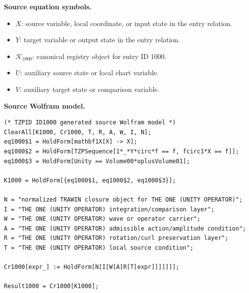 \begin{minipage}[t]{0.49\linewidth}
\begingroup
\small
\raggedright
\textbf{Source equation symbols.}\par
\begin{itemize}[leftmargin=1.35em,itemsep=1pt,topsep=1pt,parsep=0pt]
    \item $X$: source variable, local coordinate, or input state in the entry relation.
    \item $Y$: target variable or output state in the entry relation.
    \item $\mathcal{K}_{1000}$: canonical registry object for entry ID 1000.
    \item $U$: auxiliary source state or local chart variable.
    \item $V$: auxiliary target state or comparison variable.
\end{itemize}
\endgroup
\end{minipage}\hfill
\begin{minipage}[t]{0.47\linewidth}
\begingroup
\scriptsize
\raggedright
\textbf{Source Wolfram model.}\par
\begin{Verbatim}[fontsize=\tiny,breaklines=true,breakanywhere=true]
(* TZPID ID1000 generated source Wolfram model *)
ClearAll[K1000, Cr1000, T, R, A, W, I, N];
eq1000$1 = HoldForm[mathbf1X[X] -> X];
eq1000$2 = HoldForm[TZPSequence[1*_*Y*circ*f == f, fcirc1*X == f]];
eq1000$3 = HoldForm[Unity == Volume00*oplusVolume01];

K1000 = HoldForm[{eq1000$1, eq1000$2, eq1000$3}];

N = "normalized TRAWIN closure object for THE ONE (UNITY OPERATOR)";
I = "THE ONE (UNITY OPERATOR) integration/comparison layer";
W = "THE ONE (UNITY OPERATOR) wave or operator carrier";
A = "THE ONE (UNITY OPERATOR) admissible action/amplitude condition";
R = "THE ONE (UNITY OPERATOR) rotation/curl preservation layer";
T = "THE ONE (UNITY OPERATOR) local source condition";

Cr1000[expr_] := HoldForm[N[I[W[A[R[T[expr]]]]]]];

Result1000 = Cr1000[K1000];
\end{Verbatim}
\endgroup
\end{minipage}

